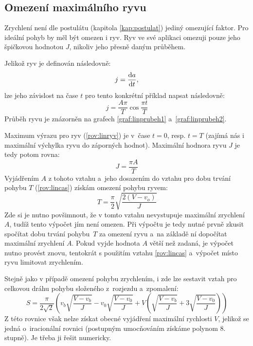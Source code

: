 		\subsection{Omezení maximálního ryvu}\label{kap:linryv}
		
		Zrychlení není dle postulátu (kapitola \ref{kap:postulat}) jediný omezující faktor. Pro ideální pohyb by měl být omezen i ryv. Ryv ve své aplikaci omezuji pouze jeho špičkovou hodnotou $J$, nikoliv jeho přesně daným průběhem.
		
		Jelikož ryv je definován následovně\cite{wiki:ryv}:
		\begin{equation}
			j=\frac{\dif a}{\dif t},
		\end{equation}
		lze jeho závislost na čase $t$ pro tento konkrétní příklad napsat následovně:
		\begin{equation}
			\label{rov:linryv}
			j=\frac{A \pi}{T} \cos \frac{\pi t}{T}
		\end{equation}
		Průběh ryvu je znázorněn na grafech \ref{graf:linprubeh1} a~\ref{graf:linprubeh2}.
		
		Maximum výrazu pro ryv (\ref{rov:linryv}) je v~čase $t=0$, resp. $t=T$ (zajímá nás i maximální výchylka ryvu do záporných hodnot). Maximální hodnora ryvu $J$ je tedy potom rovna:
		\begin{equation}
			J=\frac{\pi A}{T}
		\end{equation}
		Vyjádřením $A$ z tohoto vztahu a~jeho dosazením do vztahu pro dobu trvání pohybu $T$ (\ref{rov:lincas}) získám omezení pohybu ryvem:
		\begin{equation}
			\label{rov:linTJ}
			T=\frac{\pi}{2}\sqrt{\frac{2\left(V-v_o\right)}{J}}
		\end{equation}
		Zde si je nutno povšimnout, že v tomto vztahu nevystupuje maximální zrychlení $A$, tudíž tento výpočet jím není omezen. Při výpočtu je tedy nutné prvně zkusit spočítat dobu trvání pohybu~$T$ za omezení ryvu a~na základě ní dopočítat maximální zrychlení $A$. Pokud vyjde hodnota $A$ větší než zadaná, je výpočet nutno provést znovu, tentokrát s použitím vztahu \ref{rov:lincas} a~výpočet místo ryvu limitovat zrychlením.
		
		Stejně jako v případě omezení pohybu zrychlením, i zde lze sestavit vztah pro celkovou dráhu pohybu složeného z~rozjezdu a~zpomalení:
		\begin{equation}
				S=\frac{\pi}{2\sqrt{2}} \left(v_b\sqrt{\frac{V-v_b}{J}}-v_0\sqrt{\frac{V-v_0}{J}}+V\left(\sqrt{\frac{V-v_b}{J}}+3\sqrt{\frac{V-v_0}{J}}\right)\right)
		\end{equation} 
		Z této rovnice však nelze získat obecné vyjádření maximální rychlosti $V$, jelikož se jedná o~iracionální rovnici (postupným umocňováním získáme polynom 8. stupně). Je třeba ji řešit numericky.
		
